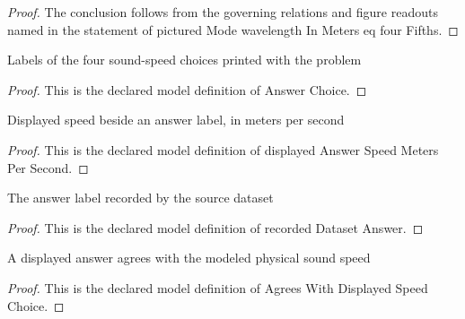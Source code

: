\begin{proof}
  The conclusion follows from the governing relations and figure readouts named in the statement of pictured Mode wavelength In Meters eq four Fifths.
\end{proof}
\begin{definition}
  \label{def:physics:phyx-mini-0179:phyxminiproblems-problemphyxmini0179-answerchoice}
  Labels of the four sound-speed choices printed with the problem
\end{definition}
\begin{proof}
  This is the declared model definition of Answer Choice.
\end{proof}
\begin{definition}
  \label{def:physics:phyx-mini-0179:phyxminiproblems-problemphyxmini0179-displayedanswerspeedmeterspersecond}
  Displayed speed beside an answer label, in meters per second
\end{definition}
\begin{proof}
  This is the declared model definition of displayed Answer Speed Meters Per Second.
\end{proof}
\begin{definition}
  \label{def:physics:phyx-mini-0179:phyxminiproblems-problemphyxmini0179-recordeddatasetanswer}
  The answer label recorded by the source dataset
\end{definition}
\begin{proof}
  This is the declared model definition of recorded Dataset Answer.
\end{proof}
\begin{definition}
  \label{def:physics:phyx-mini-0179:phyxminiproblems-problemphyxmini0179-agreeswithdisplayedspeedchoice}
  A displayed answer agrees with the modeled physical sound speed
\end{definition}
\begin{proof}
  This is the declared model definition of Agrees With Displayed Speed Choice.
\end{proof}
